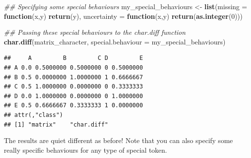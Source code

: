 \documentclass[]{book}
\newenvironment{Shaded}{\begin{snugshade}}{\end{snugshade}}
\newcommand{\CommentTok}[1]{\textcolor[rgb]{0.56,0.35,0.01}{\textit{#1}}}
\newcommand{\ControlFlowTok}[1]{\textcolor[rgb]{0.13,0.29,0.53}{\textbf{#1}}}
\newcommand{\DataTypeTok}[1]{\textcolor[rgb]{0.13,0.29,0.53}{#1}}
\newcommand{\DecValTok}[1]{\textcolor[rgb]{0.00,0.00,0.81}{#1}}
\newcommand{\KeywordTok}[1]{\textcolor[rgb]{0.13,0.29,0.53}{\textbf{#1}}}
\newcommand{\NormalTok}[1]{#1}
\newcommand{\OperatorTok}[1]{\textcolor[rgb]{0.81,0.36,0.00}{\textbf{#1}}}
\newcommand{\StringTok}[1]{\textcolor[rgb]{0.31,0.60,0.02}{#1}}
\begin{document}
\begin{Shaded}
\begin{Highlighting}[]
\CommentTok{## Specifying some special behaviours}
\NormalTok{my_special_behaviours <-}\StringTok{ }\KeywordTok{list}\NormalTok{(}\DataTypeTok{missing =} \ControlFlowTok{function}\NormalTok{(x,y) }\KeywordTok{return}\NormalTok{(y),}
                              \DataTypeTok{uncertainty =} \ControlFlowTok{function}\NormalTok{(x,y) }\KeywordTok{return}\NormalTok{(}\KeywordTok{as.integer}\NormalTok{(}\DecValTok{0}\NormalTok{)))}

\CommentTok{## Passing these special behaviours to the char.diff function}
\KeywordTok{char.diff}\NormalTok{(matrix_character, }\DataTypeTok{special.behaviour =}\NormalTok{ my_special_behaviours)}
\end{Highlighting}
\end{Shaded}

\begin{verbatim}
##     A         B         C D         E
## A 0.0 0.5000000 0.5000000 0 0.5000000
## B 0.5 0.0000000 1.0000000 1 0.6666667
## C 0.5 1.0000000 0.0000000 0 0.3333333
## D 0.0 1.0000000 0.0000000 0 1.0000000
## E 0.5 0.6666667 0.3333333 1 0.0000000
## attr(,"class")
## [1] "matrix"    "char.diff"
\end{verbatim}

The results are quiet different as before! Note that you can also specify some really specific behaviours for any type of special token.

\begin{Shaded}
\end{Shaded}
\end{document}
